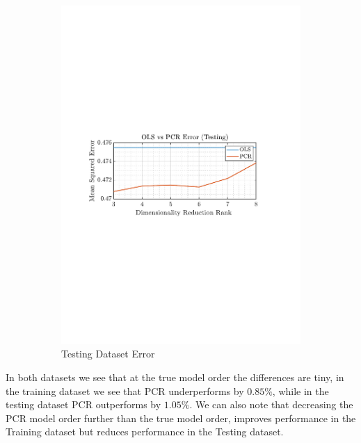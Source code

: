 \documentclass[12pt]{article}
\begin{document}
\begin{figure}[H]
\begin{subfigure}{0.49\textwidth}
 			\includegraphics[trim={2.2cm 11.2cm 3.15cm  11.2cm}, clip, width=\textwidth]{../MATLAB/figures/q1_6c_fig02.pdf} 
 			\captionsetup{justification=centering}
 			\caption{Testing Dataset Error}
 		\end{subfigure}
 		\captionsetup{justification=centering}
 		\caption{}
 		\label{fig: 1-6c}
 	\end{figure}
 
 	In both datasets we see that at the true model order the differences are tiny, in the training dataset we see that PCR underperforms by $0.85\%$, while in the testing dataset PCR outperforms by $1.05\%$. We can also note that decreasing the PCR model order further than the true model order, improves performance in the Training dataset but reduces performance in the Testing dataset.
\end{document}
